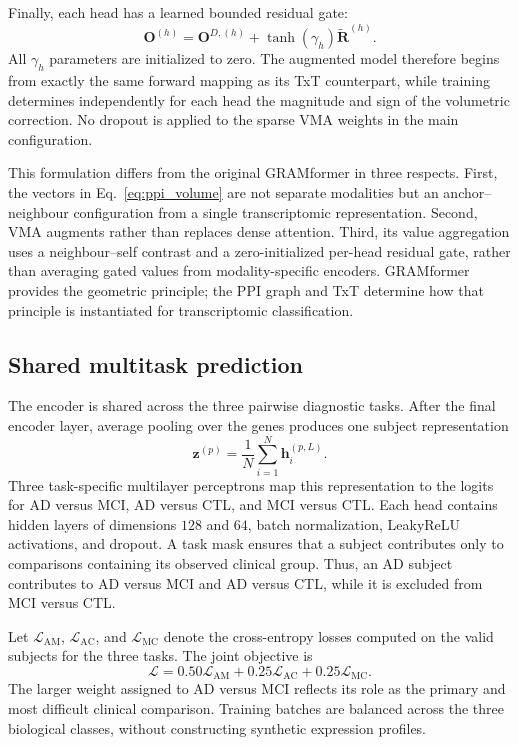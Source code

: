 Finally, each head has a learned bounded residual gate:
\begin{equation}
\label{eq:vma_fusion}
    \mathbf{O}^{(h)}
    =
    \mathbf{O}^{D,(h)}
    +\tanh\!\left(\gamma_h\right)
    \widetilde{\mathbf{R}}^{(h)}.
\end{equation}
All \(\gamma_h\) parameters are initialized to zero. The augmented model therefore begins from exactly the same forward mapping as its TxT counterpart, while training determines independently for each head the magnitude and sign of the volumetric correction. No dropout is applied to the sparse VMA weights in the main configuration.

This formulation differs from the original GRAMformer in three respects. First, the vectors in Eq.~\eqref{eq:ppi_volume} are not separate modalities but an anchor--neighbour configuration from a single transcriptomic representation. Second, VMA augments rather than replaces dense attention. Third, its value aggregation uses a neighbour--self contrast and a zero-initialized per-head residual gate, rather than averaging gated values from modality-specific encoders. GRAMformer provides the geometric principle; the PPI graph and TxT determine how that principle is instantiated for transcriptomic classification.

\subsection{Shared multitask prediction}

The encoder is shared across the three pairwise diagnostic tasks. After the final encoder layer, average pooling over the genes produces one subject representation
\begin{equation}
    \mathbf{z}^{(p)}=\frac{1}{N}\sum_{i=1}^{N}\mathbf{h}^{(p,L)}_i.
\end{equation}
Three task-specific multilayer perceptrons map this representation to the logits for AD versus MCI, AD versus CTL, and MCI versus CTL. Each head contains hidden layers of dimensions \(128\) and \(64\), batch normalization, LeakyReLU activations, and dropout. A task mask ensures that a subject contributes only to comparisons containing its observed clinical group. Thus, an AD subject contributes to AD versus MCI and AD versus CTL, while it is excluded from MCI versus CTL.

Let \(\mathcal{L}_{\mathrm{AM}}\), \(\mathcal{L}_{\mathrm{AC}}\), and \(\mathcal{L}_{\mathrm{MC}}\) denote the cross-entropy losses computed on the valid subjects for the three tasks. The joint objective is
\begin{equation}
\label{eq:txt_multitask_loss}
    \mathcal{L}
    =0.50\mathcal{L}_{\mathrm{AM}}
    +0.25\mathcal{L}_{\mathrm{AC}}
    +0.25\mathcal{L}_{\mathrm{MC}}.
\end{equation}
The larger weight assigned to AD versus MCI reflects its role as the primary and most difficult clinical comparison. Training batches are balanced across the three biological classes, without constructing synthetic expression profiles.


